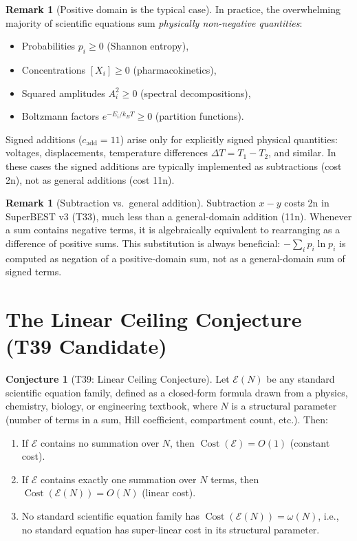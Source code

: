 \documentclass[12pt,a4paper]{article}
\theoremstyle{definition}
\newtheorem{conjecture}[theorem]{Conjecture}
\newtheorem{remark}[theorem]{Remark}
\newcommand{\Cost}{\operatorname{Cost}}
\begin{document}
\begin{remark}[Positive domain is the typical case]
In practice, the overwhelming majority of scientific equations sum
\emph{physically non-negative quantities}:
\begin{itemize}
  \item Probabilities $p_i \geq 0$ (Shannon entropy),
  \item Concentrations $[X_i] \geq 0$ (pharmacokinetics),
  \item Squared amplitudes $A_i^2 \geq 0$ (spectral decompositions),
  \item Boltzmann factors $e^{-E_i/k_BT} \geq 0$ (partition functions).
\end{itemize}
Signed additions ($c_{\mathrm{add}} = 11$) arise only for explicitly
signed physical quantities: voltages, displacements, temperature
differences $\Delta T = T_1 - T_2$, and similar.  In these cases the
signed additions are typically implemented as subtractions (cost 2n),
not as general additions (cost 11n).
\end{remark}

\begin{remark}[Subtraction vs.\ general addition]
Subtraction $x - y$ costs 2n in SuperBEST v3 (T33), much less than a
general-domain addition (11n).  Whenever a sum contains negative terms,
it is algebraically equivalent to rearranging as a difference of
positive sums.  This substitution is always beneficial:
$-\sum_i p_i \ln p_i$ is computed as negation of a positive-domain sum,
not as a general-domain sum of signed terms.
\end{remark}

\section{The Linear Ceiling Conjecture (T39 Candidate)}
\label{sec:conjecture}

\begin{conjecture}[T39: Linear Ceiling Conjecture]
\label{conj:T39}
Let $\mathcal{E}(N)$ be any standard scientific equation family,
defined as a closed-form formula drawn from a physics, chemistry,
biology, or engineering textbook, where $N$ is a structural parameter
(number of terms in a sum, Hill coefficient, compartment count, etc.).
Then:
\begin{enumerate}
  \item[\textup{(i)}] If $\mathcal{E}$ contains no summation over $N$,
        then $\Cost(\mathcal{E}) = O(1)$ (constant cost).
  \item[\textup{(ii)}] If $\mathcal{E}$ contains exactly one summation
        over $N$ terms, then $\Cost(\mathcal{E}(N)) = O(N)$ (linear cost).
  \item[\textup{(iii)}] No standard scientific equation family has
        $\Cost(\mathcal{E}(N)) = \omega(N)$, i.e., no standard equation
        has super-linear cost in its structural parameter.
\end{enumerate}
\end{conjecture}
\end{document}
